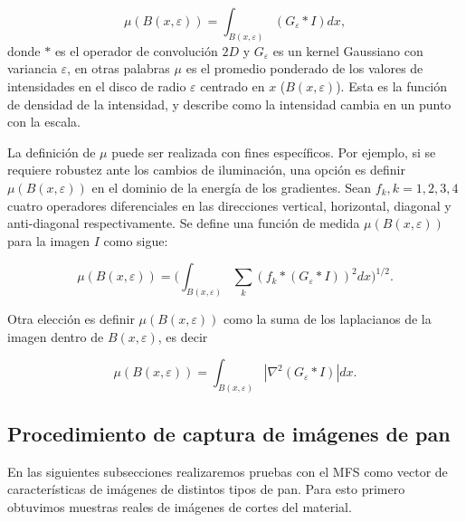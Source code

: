 \begin{equation}
\mu(B(x,\varepsilon)) = \int_{B(x,\varepsilon)}{(G_{\varepsilon} \ast I)} dx,
\label{eqn:eqn11}
\end{equation}
donde $\ast$ es el operador de convolución $2D$ y $G_{\varepsilon}$ es un kernel Gaussiano con variancia $\varepsilon$, en otras palabras $\mu$ es el promedio ponderado de los valores de intensidades en el disco de radio $\varepsilon$ centrado en $x$ ($B(x,\varepsilon)$).
Esta es la función de densidad de la intensidad, y describe como la intensidad cambia en un punto con la escala.

La definición de $\mu$ puede ser realizada con fines específicos.
Por ejemplo, si se requiere robustez ante los cambios de iluminación, una opción es definir $\mu(B(x,\varepsilon))$ en el dominio de la energía de los gradientes.
Sean ${ f_{k} , k = 1, 2, 3, 4}$ cuatro operadores diferenciales en las direcciones vertical, horizontal, diagonal y anti-diagonal respectivamente.
Se define una función de medida $\mu(B(x,\varepsilon))$ para la imagen $I$ como sigue:

\begin{equation}
\mu(B(x,\varepsilon)) = (\int_{B(x,\varepsilon)}{\sum_{k}{(f_{k} \ast (G_{\varepsilon} \ast I))^{2}} dx)^{1/2}}.
\label{eqn:gradient}
\end{equation}

Otra elección es definir $\mu(B(x, \varepsilon))$ como la suma de los laplacianos de la imagen dentro de $B(x, \varepsilon)$, es decir

\begin{equation}
\mu(B(x,\varepsilon)) = \int_{B(x,\varepsilon)}|\nabla^2 (G_{\varepsilon} \ast I)| dx.
\label{eqn:laplacian}
\end{equation}

\subsection{Procedimiento de captura de imágenes de pan}
En las siguientes subsecciones realizaremos pruebas con el MFS como vector de características de imágenes de distintos tipos de pan.
Para esto primero obtuvimos muestras reales de imágenes de cortes del material.

